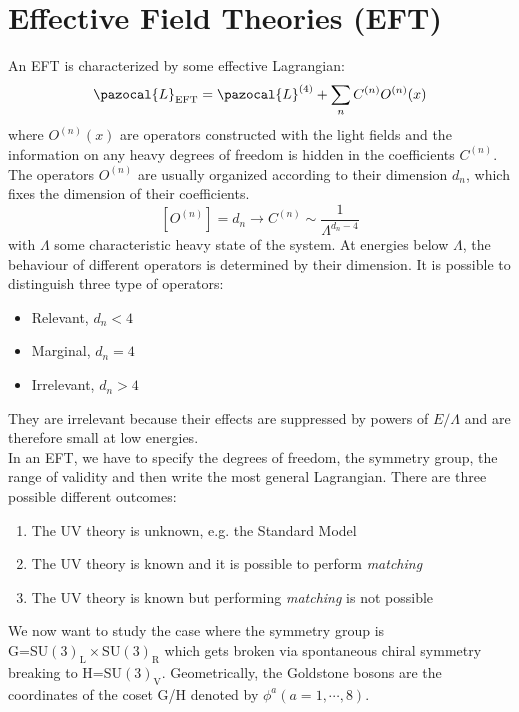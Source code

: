 \documentclass[../main.tex]{subfiles}
\begin{document}
\section{Effective Field Theories (EFT)}
An EFT is characterized by some effective Lagrangian:
\[
\pazocal{L}_{\text{EFT}}=\pazocal{L}^{(4)}+\sum_n C^{(n)}O^{(n)}(x)
\]
where $O^{(n)}(x)$ are operators constructed with the light fields and the information on any heavy degrees of freedom is hidden in the coefficients $C^{(n)}$. The
operators $O^{(n)}$ are usually organized according to their dimension $d_n$, which fixes the dimension of their coefficients.
\[
[O^{(n)}]=d_n\to C^{(n)}\sim\frac{1}{\Lambda^{d_n-4}}
\]
with $\Lambda$ some characteristic heavy state of the system. At energies below $\Lambda$, the behaviour of different operators is determined by their dimension. It is possible to distinguish three type of operators:
\begin{itemize}
    \item Relevant, $d_n<4$
    \item Marginal, $d_n=4$
    \item Irrelevant, $d_n>4$
\end{itemize}
They are irrelevant because their effects are suppressed by powers of $E/\Lambda$ and are therefore small at low energies.\\
In an EFT, we have to specify the degrees of freedom, the symmetry group, the range of validity and then write the most general Lagrangian. There are three possible different outcomes:
\begin{enumerate}
    \item The UV theory is unknown, e.g. the Standard Model
    \item The UV theory is known and it is possible to perform \textit{matching}
    \item The UV theory is known but performing \textit{matching} is not possible
\end{enumerate}
We now want to study the case where the symmetry group is\\
G=SU$(3)_{\text{L}}\times$SU$(3)_{\text{R}}$ which gets broken via spontaneous chiral symmetry breaking to H=SU$(3)_{\text{V}}$. Geometrically, the Goldstone bosons are the coordinates of the coset G/H denoted by $\phi^a(a=1,\cdots,8)$.\\
\end{document}
